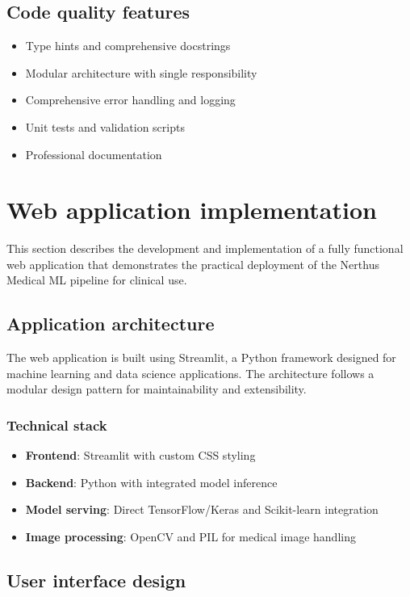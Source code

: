 \documentclass[11pt]{article}
\begin{document}
\subsection{Code quality features}
\begin{itemize}
    \item Type hints and comprehensive docstrings
    \item Modular architecture with single responsibility
    \item Comprehensive error handling and logging
    \item Unit tests and validation scripts
    \item Professional documentation
\end{itemize}

\section{Web application implementation}
\label{sec:web_application}

This section describes the development and implementation of a fully functional web application that demonstrates the practical deployment of the Nerthus Medical ML pipeline for clinical use.

\subsection{Application architecture}

The web application is built using Streamlit, a Python framework designed for machine learning and data science applications. The architecture follows a modular design pattern for maintainability and extensibility.

\subsubsection{Technical stack}
\begin{itemize}
    \item \textbf{Frontend}: Streamlit with custom CSS styling
    \item \textbf{Backend}: Python with integrated model inference
    \item \textbf{Model serving}: Direct TensorFlow/Keras and Scikit-learn integration
    \item \textbf{Image processing}: OpenCV and PIL for medical image handling
\end{itemize}

\subsection{User interface design}
\end{document}
